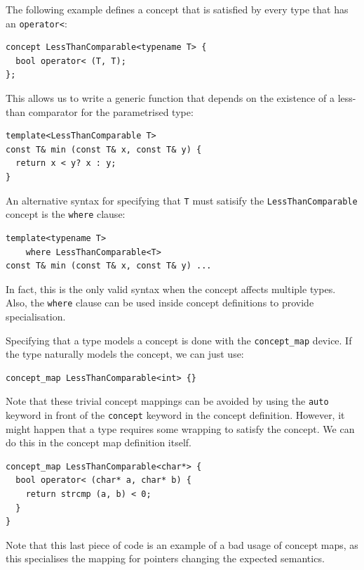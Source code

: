 The following example defines a concept that is satisfied by every
type that has an \texttt{operator<}:

\begin{lstlisting}
concept LessThanComparable<typename T> {
  bool operator< (T, T);
};
\end{lstlisting}

This allows us to write a generic function that depends on the
existence of a less-than comparator for the parametrised type:

\begin{lstlisting}
template<LessThanComparable T>
const T& min (const T& x, const T& y) {
  return x < y? x : y;
}
\end{lstlisting}

An alternative syntax for specifying that \texttt{T} must satisify the
\texttt{LessThanComparable} concept is the \texttt{where} clause:

\begin{lstlisting}
template<typename T>
    where LessThanComparable<T>
const T& min (const T& x, const T& y) ...
\end{lstlisting}

In fact, this is the only valid syntax when the concept affects
multiple types. Also, the \texttt{where} clause can be used inside
concept definitions to provide specialisation.

Specifying that a type models a concept is done with the
\texttt{concept\_map} device. If the type naturally models the
concept, we can just use:

\begin{lstlisting}
concept_map LessThanComparable<int> {}
\end{lstlisting}

Note that these trivial concept mappings can be avoided by using the
\texttt{auto} keyword in front of the \texttt{concept} keyword in the
concept definition. However, it might happen that a type requires some
wrapping to satisfy the concept. We can do this in the concept map
definition itself.

\begin{lstlisting}
concept_map LessThanComparable<char*> {
  bool operator< (char* a, char* b) {
    return strcmp (a, b) < 0;
  }
}
\end{lstlisting}

Note that this last piece of code is an example of a bad usage of
concept maps, as this specialises the mapping for pointers changing
the expected semantics.

